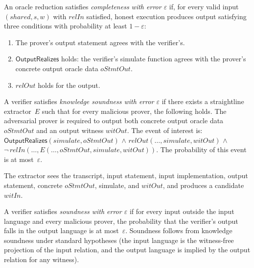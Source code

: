 \begin{definition}
  \label{int:oracle-completeness}
  An oracle reduction satisfies \emph{completeness with error $\varepsilon$}
  if, for every valid input $(\mathit{shared}, s, w)$ with $\mathit{relIn}$
  satisfied, honest execution produces output satisfying three conditions
  with probability at least $1 - \varepsilon$:
  \begin{enumerate}
    \item The prover's output statement agrees with the verifier's.
    \item $\mathsf{OutputRealizes}$ holds: the verifier's simulate function
      agrees with the prover's concrete output oracle data
      $\mathit{oStmtOut}$.
    \item $\mathit{relOut}$ holds for the output.
  \end{enumerate}
\end{definition}

\begin{definition}
  \label{int:oracle-knowledge-soundness}
  A verifier satisfies \emph{knowledge soundness with error $\varepsilon$}
  if there exists a straightline extractor~$E$ such that for every malicious
  prover, the following holds.
  The adversarial prover is required to output both concrete output oracle
  data $\mathit{oStmtOut}$ and an output witness $\mathit{witOut}$.
  The event of interest is:
  $\mathsf{OutputRealizes}(\mathit{simulate}, \mathit{oStmtOut})$
  $\wedge$ $\mathit{relOut}(\ldots, \mathit{simulate}, \mathit{witOut})$
  $\wedge$ $\neg\,\mathit{relIn}(\ldots,
    E(\ldots, \mathit{oStmtOut}, \mathit{simulate}, \mathit{witOut}))$.
  The probability of this event is at most~$\varepsilon$.

  The extractor sees the transcript, input statement, input implementation,
  output statement, concrete $\mathit{oStmtOut}$, simulate, and
  $\mathit{witOut}$, and produces a candidate $\mathit{witIn}$.
\end{definition}

\begin{definition}
  \label{int:oracle-soundness}
  A verifier satisfies \emph{soundness with error $\varepsilon$} if for
  every input outside the input language and every malicious prover, the
  probability that the verifier's output falls in the output language is at
  most~$\varepsilon$.
  Soundness follows from knowledge soundness under standard hypotheses (the
  input language is the witness-free projection of the input relation, and
  the output language is implied by the output relation for any witness).
\end{definition}
